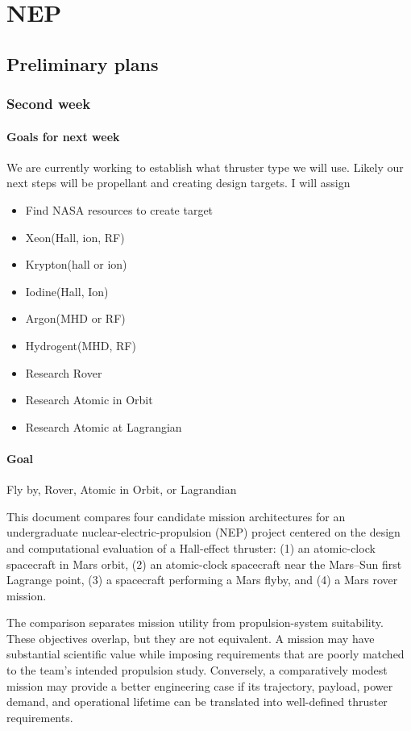 \chapter{NEP}

\section{Preliminary plans}
\subsection{Second week}
\subsubsection{Goals for next week}
We are currently working to establish what thruster type we will use. Likely our next steps will be propellant and creating design targets. I will assign
\begin{itemize}
	\item Find NASA resources to create target
	\item Xeon(Hall, ion, RF)
	\item Krypton(hall or ion)
	\item Iodine(Hall, Ion)
	\item Argon(MHD or RF)
	\item Hydrogent(MHD, RF)
	\item Research Rover
	\item Research Atomic in Orbit
	\item Research Atomic at Lagrangian
\end{itemize}

\subsubsection{Goal}
Fly by, Rover, Atomic in Orbit, or Lagrandian

This document compares four candidate mission architectures for an
undergraduate nuclear-electric-propulsion (NEP) project centered on
the design and computational evaluation of a Hall-effect thruster:
(1) an atomic-clock spacecraft in Mars orbit, (2) an atomic-clock
spacecraft near the Mars--Sun first Lagrange point, (3) a spacecraft
performing a Mars flyby, and (4) a Mars rover mission.

The comparison separates mission utility from propulsion-system
suitability. These objectives overlap, but they are not equivalent.
A mission may have substantial scientific value while imposing
requirements that are poorly matched to the team's intended
propulsion study. Conversely, a comparatively modest mission may
provide a better engineering case if its trajectory, payload,
power demand, and operational lifetime can be translated into
well-defined thruster requirements.

